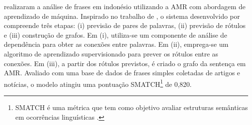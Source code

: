 \textcite{ilmy2021} realizaram a análise de frases em indonésio
utilizando a AMR com abordagem de aprendizado de máquina. Inspirado no
trabalho de \textcite{zhang2019}, o sistema desenvolvido por \textcite{ilmy2021} compreende três etapas: (i) previsão de pares de palavras, (ii)
previsão de rótulos e (iii) construção de grafos. Em (i), utiliza-se um
componente de análise de dependência para obter as conexões entre
palavras. Em (ii), emprega-se um algoritmo de aprendizado supervisionado
para prever os rótulos entre as conexões. Em (iii), a partir dos rótulos
previstos, é criado o grafo da sentença em AMR. Avaliado com uma base de
dados de frases simples coletadas de artigos e notícias, o modelo
atingiu uma pontuação SMATCH\footnote{SMATCH é uma métrica que tem como
  objetivo avaliar estruturas semânticas em ocorrências linguísticas
  \cite{cai2013}.} de 0,820.
